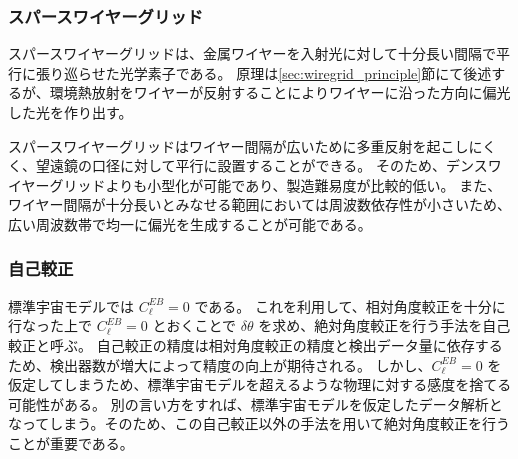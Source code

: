 \documentclass[../../main.tex]{subfiles}
\begin{document}
\subsubsection{スパースワイヤーグリッド}
スパースワイヤーグリッドは、金属ワイヤーを入射光に対して十分長い間隔で平行に張り巡らせた光学素子である。
原理は\ref{sec:wiregrid_principle}節にて後述するが、環境熱放射をワイヤーが反射することによりワイヤーに沿った方向に偏光した光を作り出す。

スパースワイヤーグリッドはワイヤー間隔が広いために多重反射を起こしにくく、望遠鏡の口径に対して平行に設置することができる。
そのため、デンスワイヤーグリッドよりも小型化が可能であり、製造難易度が比較的低い。
また、ワイヤー間隔が十分長いとみなせる範囲においては周波数依存性が小さいため、
広い周波数帯で均一に偏光を生成することが可能である。

\subsubsection{自己較正}
標準宇宙モデルでは $C_{\ell}^{EB}=0$ である。
これを利用して、相対角度較正を十分に行なった上で $C_{\ell}^{EB} = 0$ とおくことで
$\delta\theta$ を求め、絶対角度較正を行う手法を自己較正と呼ぶ。
自己較正の精度は相対角度較正の精度と検出データ量に依存するため、検出器数が増大によって精度の向上が期待される。
しかし、$C_{\ell}^{EB}=0$ を仮定してしまうため、標準宇宙モデルを超えるような物理に対する感度を捨てる可能性がある。
別の言い方をすれば、標準宇宙モデルを仮定したデータ解析となってしまう。そのため、この自己較正以外の手法を用いて絶対角度較正を行うことが重要である。
\end{document}
